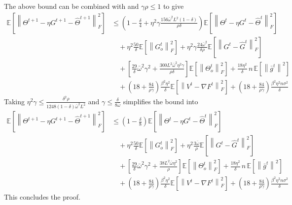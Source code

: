 \documentclass[10pt]{article} %
\theoremstyle{plain}
\theoremstyle{definition}
\theoremstyle{remark}
\newcommand{\grdF}{\nabla F}
\newcommand{\bw}{\bar{\omega}}
\newcommand{\avgg}{\bar{g}}
\newcommand{\norm}[1]{\left\| #1 \right\|}
\newcommand{\nl}{\nonumber\\}
\begin{document}
The above bound can be combined with  and $\gamma \rho \leq 1$ to give
\begin{align}
    \mathbb{E} \left[ \norm{\Theta^{t+1}- \eta G^{t+1}- \hat{\Theta}^{t+1}}_F^2 \right] & \leq \left(1-\frac{\delta}{4} + \eta^2 \gamma \frac{156 \bw^2 L^2 (1-\delta)}{\rho \delta} \right) \mathbb{E} \left[ \norm{\Theta^t - \eta G^t - \hat{\Theta}^t}_F^2 \right] \nl 
    & \quad + \eta^2 \frac{50}{\delta} \mathbb{E} \left[ \norm{G_o^t}_F^2 \right] + \eta^2 \gamma \frac{24 \bw^2}{\delta \rho} \mathbb{E} \left[ \norm{G^{t} - \hat{G}^t}_F^2 \right] \nl 
    & \quad + \left[ \frac{29}{\delta} \bw^2 \gamma^2 + \frac{300 L^2 \bw^2 \eta^2 \gamma}{\rho \delta} \right] \mathbb{E} \left[ \norm{\Theta_o^t}_F^2 \right] + \frac{18 \eta^2}{\delta} \, n \, \mathbb{E}  \left[ \norm{ \avgg^t }^2 \right] \nl 
    & \quad +  \left( 18 + \frac{84}{\rho\gamma} \right)\frac{ \beta^2\eta^2 }{\delta} \mathbb{E} \left[ \norm{ V^t - \grdF^t }_F^2 \right] + \left( 18 + \frac{84}{\rho \gamma} \right) \frac{\beta^2 \eta^2 n\sigma^2}{\delta} \nonumber
\end{align}
Taking  $\eta^2 \gamma \leq \frac{\delta^2 \rho}{1248 (1-\delta)\bw^2 L^2}$ and $\gamma \leq \frac{\delta}{8\bw}$ simplifies the bound into
\begin{align}
    \mathbb{E} \left[ \norm{\Theta^{t+1}- \eta G^{t+1}- \hat{\Theta}^{t+1}}_F^2 \right] & \leq \left(1-\frac{\delta}{8} \right) \mathbb{E} \left[ \norm{\Theta^t - \eta G^t - \hat{\Theta}^t}_F^2 \right] \nl 
    & \quad + \eta^2 \frac{50}{\delta} \mathbb{E} \left[ \norm{G_o^t}_F^2 \right] + \eta^2 \frac{3 \bw}{\rho} \mathbb{E} \left[ \norm{G^{t} - \hat{G}^t}_F^2 \right] \nl 
    & \quad + \left[ \frac{29}{\delta} \bw^2 \gamma^2 + \frac{38 L^2 \bw \eta^2}{\rho} \right] \mathbb{E} \left[ \norm{\Theta_o^t}_F^2 \right] + \frac{18 \eta^2}{\delta} \, n \, \mathbb{E}  \left[ \norm{ \avgg^t }^2 \right] \nl 
    & \quad + \left( 18 + \frac{84}{\rho\gamma} \right)\frac{ \beta^2\eta^2 }{\delta} \mathbb{E} \left[ \norm{ V^t - \grdF^t }_F^2 \right] + \left( 18 + \frac{84}{\rho \gamma} \right) \frac{\beta^2 \eta^2 n\sigma^2}{\delta} \nonumber
\end{align}
This concludes the proof.
\end{document}
